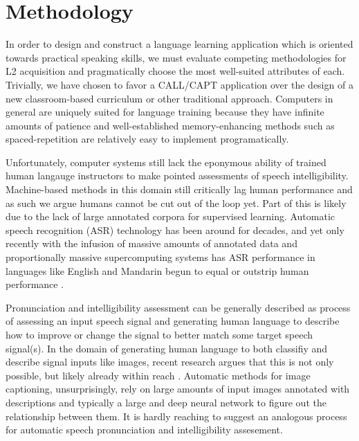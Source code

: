 \section{Methodology} 
In order to design and construct a language learning application which is oriented towards practical speaking skills, we must evaluate competing methodologies for L2 acquisition and pragmatically choose the most well-suited attributes of each. Trivially, we have chosen to favor a CALL/CAPT application over the design of a new classroom-based curriculum or other traditional approach. Computers in general are uniquely suited for language training because they have infinite amounts of patience and well-established memory-enhancing methods such as spaced-repetition \cite{glanzer1971repetition} \cite{wozniak2007supermemo} \cite{wozniak1990supermemo} \cite{cuddy1982forgetting} are relatively easy to implement programatically. 

Unfortunately, computer systems still lack the eponymous ability of trained human langauge instructors to make pointed assessments of speech intelligibility. Machine-based methods in this domain still critically lag human performance and as such we argue humans cannot be cut out of the loop yet. Part of this is likely due to the lack of large annotated corpora for supervised learning. Automatic speech recognition (ASR) technology has been around for decades, and yet only recently with the infusion of massive amounts of annotated data and proportionally massive supercomputing systems has ASR performance in languages like English and Mandarin begun to equal or outstrip human performance \cite{hannun2014deep} \cite{hinton2012deep} \cite{chan2016listen}. 

Pronunciation and intelligibility assessment can be generally described as process of assessing an input speech signal and generating human language to describe how to improve or change the signal to better match some target speech signal(s). In the domain of generating human language to both classifiy and describe signal inputs like images, recent research argues that this is not only possible, but likely already within reach \cite{reed2016learning} \cite{tran2016rich}. Automatic methods for image captioning, unsurprisingly, rely on large amounts of input images annotated with descriptions and typically a large and deep neural network to figure out the relationship between them. It is hardly reaching to suggest an analogous process for automatic speech pronunciation and intelligibility assesement. 

